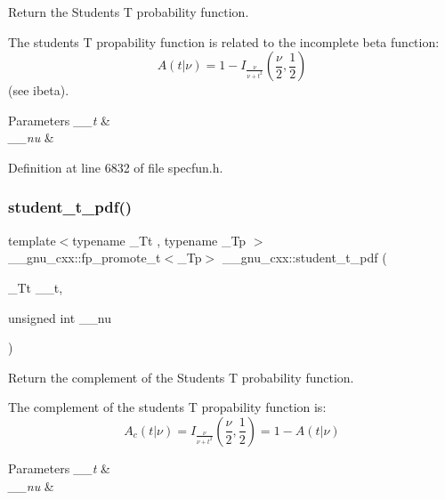 Return the Students T probability function. 

The students T propability function is related to the incomplete beta function\+: \[ A(t|\nu) = 1 - I_{\frac{\nu}{\nu + t^2}}(\frac{\nu}{2}, \frac{1}{2}) \] (see ibeta).


\begin{DoxyParams}{Parameters}
{\em \+\_\+\+\_\+t} & \\
\hline
{\em \+\_\+\+\_\+nu} & \\
\hline
\end{DoxyParams}


Definition at line 6832 of file specfun.\+h.

\mbox{\label{group__gnu__math__spec__func_ga95a4c03cf0a8104e9a15a35acfe5fb3a}} 
\subsubsection{\texorpdfstring{student\+\_\+t\+\_\+pdf()}{student\_t\_pdf()}}
{\footnotesize\ttfamily template$<$typename \+\_\+\+Tt , typename \+\_\+\+Tp $>$ \\
\+\_\+\+\_\+gnu\+\_\+cxx\+::fp\+\_\+promote\+\_\+t$<$\+\_\+\+Tp$>$ \+\_\+\+\_\+gnu\+\_\+cxx\+::student\+\_\+t\+\_\+pdf (\begin{DoxyParamCaption}\item[{\+\_\+\+Tt}]{\+\_\+\+\_\+t,  }\item[{unsigned int}]{\+\_\+\+\_\+nu }\end{DoxyParamCaption})}



Return the complement of the Students T probability function. 

The complement of the students T propability function is\+: \[ A_c(t|\nu) = I_{\frac{\nu}{\nu + t^2}}(\frac{\nu}{2}, \frac{1}{2}) = 1 - A(t|\nu) \]


\begin{DoxyParams}{Parameters}
{\em \+\_\+\+\_\+t} & \\
\hline
{\em \+\_\+\+\_\+nu} & \\
\hline
\end{DoxyParams}


